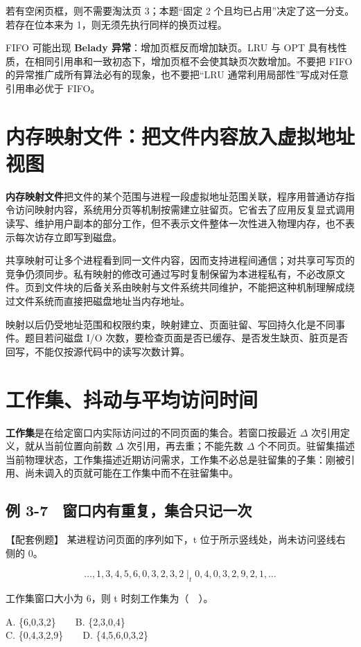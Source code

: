 若有空闲页框，则不需要淘汰页 3；本题``固定 2 个且均已占用''决定了这一分支。若存在位本来为 1，则无须先执行同样的换页过程。

FIFO 可能出现 \textbf{Belady 异常}：增加页框反而增加缺页。LRU 与 OPT 具有栈性质，在相同引用串和一致初态下，增加页框不会使其缺页次数增加。不要把 FIFO 的异常推广成所有算法必有的现象，也不要把``LRU 通常利用局部性''写成对任意引用串必优于 FIFO。

\section{内存映射文件：把文件内容放入虚拟地址视图}\label{OS03-5-10}

\textbf{内存映射文件}把文件的某个范围与进程一段虚拟地址范围关联，程序用普通访存指令访问映射内容，系统用分页等机制按需建立驻留页。它省去了应用反复显式调用读写、维护用户副本的部分工作，但不表示文件整体一次性进入物理内存，也不表示每次访存立即写到磁盘。

共享映射可让多个进程看到同一文件内容，因而支持进程间通信；对共享可写页的竞争仍须同步。私有映射的修改可通过写时复制保留为本进程私有，不必改原文件。页到文件块的后备关系由映射与文件系统共同维护，不能把这种机制理解成绕过文件系统而直接把磁盘地址当内存地址。

映射以后仍受地址范围和权限约束，映射建立、页面驻留、写回持久化是不同事件。题目若问磁盘 I/O 次数，要检查页面是否已缓存、是否发生缺页、脏页是否回写，不能仅按源代码中的读写次数计算。

\section{工作集、抖动与平均访问时间}\label{OS03-5-11}

\textbf{工作集}是在给定窗口内实际访问过的不同页面的集合。若窗口按最近 \(\Delta\) 次引用定义，就从当前位置向前数 \(\Delta\) 次引用，再去重；不能先数 \(\Delta\) 个不同页。驻留集描述当前物理状态，工作集描述近期访问需求，工作集不必总是驻留集的子集：刚被引用、尚未调入的页就可能在工作集中而不在驻留集中。

\subsection{例 3-7　窗口内有重复，集合只记一次}\label{OS03-ex5-7}

\begin{example}[配套例题]

【配套例题】 某进程访问页面的序列如下，t 位于所示竖线处，尚未访问竖线右侧的 0。

\[\ldots,1,3,4,5,6,0,3,2,3,2\;\big|_{t}\;0,4,0,3,2,9,2,1,\ldots\]

工作集窗口大小为 6，则 t 时刻工作集为（　）。

A. \{6,0,3,2\}　　B. \{2,3,0,4\}\\
C. \{0,4,3,2,9\}　　D. \{4,5,6,0,3,2\}

\end{example}

